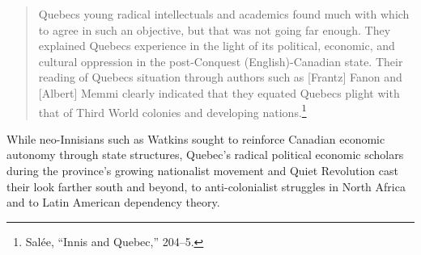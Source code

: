 \documentclass{tufte-handout}
\begin{document}
\begin{quote}
Quebec\textquotesingle s young radical intellectuals and academics found
much with which to agree in such an objective, but that was not going
far enough. They explained Quebec\textquotesingle s experience in the
light of its political, economic, and cultural oppression in the
post-Conquest (English)-Canadian state. Their reading of
Quebec\textquotesingle s situation through authors such as {[}Frantz{]}
Fanon and {[}Albert{]} Memmi clearly indicated that they equated
Quebec\textquotesingle s plight with that of Third World colonies and
developing nations.\footnote{Salée, ``Innis and Quebec,'' 204--5.}
\end{quote}

While neo-Innisians such as Watkins sought to reinforce Canadian
economic autonomy through state structures, Quebec's radical political
economic scholars during the province's growing nationalist movement and
Quiet Revolution cast their look farther south and beyond, to
anti-colonialist struggles in North Africa and to Latin American
dependency theory.
\end{document}
